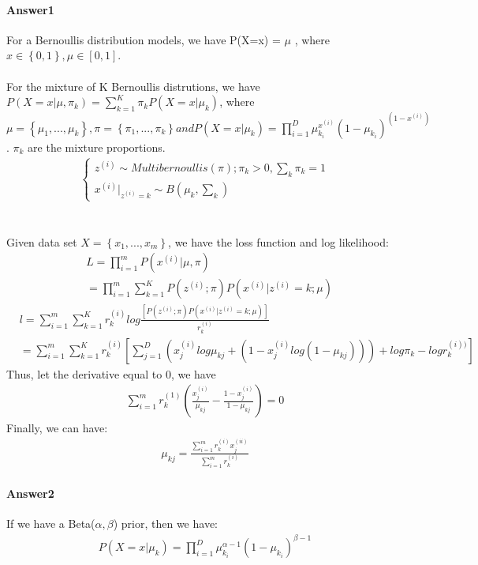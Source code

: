 \documentclass[paper=a4, fontsize=11pt]{scrartcl} %
\numberwithin{equation}{section} %
\numberwithin{figure}{section} %
\numberwithin{table}{section} %
\begin{document}
\paragraph{\textbf{Answer1}}
For a Bernoullis distribution models, we have P(X=x) = $\mu$ , where $x\in \left \{ 0,1 \right \}, \mu \in \left [ 0,1 \right ]$.
\\\\ For the mixture of K Bernoullis distrutions, we have $P(X=x|\mu , \pi _{k})=\sum_{k=1}^{K}\pi_{k}P(X=x|\mu _{k})$, where $\mu =\left \{ \mu _{1},...,\mu _{k} \right \}, \pi=\left \{ \pi_{1},...,\pi_{k} \right \} and P(X=x|\mu_{k})=\prod_{i=1}^{D}\mu_{k_{i}}^{x^{(i)}}(1-\mu_{k_{i}})^{(1-x^{(i)})}$. $\pi_{k}$ are the mixture proportions.
\begin{align*}
\left\{\begin{matrix}
	z^{(i)} \sim Multibernoullis(\pi); \pi_{k}>0, \sum_{k}\pi_{k}=1
	\\ 
	x^{(i)}|_{z^{(i)}=k} \sim B(\mu_{k},\sum_{k})
\end{matrix}\right.
\end{align*}
\\\\Given data set $X=\left\{x_{1},...,x_{m}\right\}$, we have the loss function and log likelihood:
\begin{align*}
&L=\prod_{i=1}^{m}P(x^{(i)}|\mu,\pi)
\\&=\prod_{i=1}^{m}\sum_{k=1}^{K}P(z^{(i)};\pi)P(x^{(i)}|z^{(i)}=k;\mu)
\end{align*}
\begin{align*}
&l=\sum_{i=1}^{m}\sum_{k=1}^{K}r_{k}^{(i)}log\frac{\left [P(z^{(i)};\pi)P(x^{(i)}|z^{(i)}=k;\mu)  \right ]}{r_{k}^{(i)}}
\\&=\sum_{i=1}^{m}\sum_{k=1}^{K}r_{k}^{(i)}\left [ \sum_{j=1}^{D}\left ( x_{j}^{(i)}log\mu_{kj}+\left ( 1-x_{j}^{(i)}log(1-\mu_{kj}) \right ) \right ) + log\pi_{k}-logr_{k}^{(i))} \right ]
\end{align*}
Thus, let the derivative equal to 0, we have
\begin{align*}
\sum_{i=1}^{m}r_{k}^{(1)}\left ( \frac{x_{j}^{(i)}}{\mu_{kj}}- \frac{1-x_{j}^{(i)}}{1-\mu_{kj}}\right )=0
\end{align*}
Finally, we can have:
\begin{align*}
\mu_{kj}=\frac{\sum_{i=1}^{m}r_{k}^{(i)}x_{j}^{(ii)}}{\sum_{i=1}^{m}r_{k}^{(i)}}
\end{align*}


\paragraph{\textbf{Answer2}}
If we have a Beta($\alpha, \beta $) prior, then we have:
\begin{align*}
P(X=x|\mu_{k})=\prod_{i=1}^{D}\mu_{k_{i}}^{\alpha - 1}(1-\mu_{k_{i}})^{\beta-1}
\end{align*}
\end{document}
